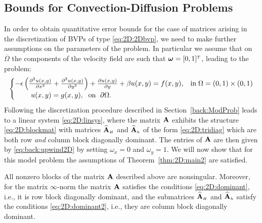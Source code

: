 \subsection{Bounds for Convection-Diffusion Problems}
\label{2D:bounds:conv-diff}
In order to obtain quantitative error bounds for the case of matrices arising
in the discretization of BVPs of type \eqref{eq:2D:2Dbvp}, we need to make
further assumptions on the parameters of the problem. In particular we assume
that on $\overline{\Omega}$ the components of the velocity field are such
that $\bm{\omega}=[0,1]^{\scriptscriptstyle T}$, leading to the problem:
%
\begin{equation}\label{eq:2D:2Dbvp_e}
\begin{cases}
-\epsilon\left(\frac{\partial^2 u(x,y)}{\partial x^2} + \frac{\partial^2 u(x,y)}{\partial y^2}\right) + \frac{\partial u(x,y)}{\partial y}+ \beta u(x,y)=f(x,y), & \text{in}\; \Omega=(0,1)\times(0,1)\\
\hspace{0.8cm} u(x,y)=g(x,y),\;\text{ on }\;\partial\Omega. &
\end{cases}
\end{equation}
%
Following the discretization procedure described in Section~\ref{back:ModProb}
leads to a linear system \eqref{eq:2D:linsys}, where the matrix $\mathbf{A}$ exhibits
the structure \eqref{eq:2D:blockmat} with matrices $\widehat{\mathbf{A}}_{\scriptscriptstyle H}$ and $\widehat{\mathbf{A}}_{\scriptscriptstyle h}$
of the form \eqref{eq:2D:tridiag} which are both row \emph{and} column block
diagonally dominant. The entries of $\mathbf{A}$ are then given by
\eqref{eq:back:upwind2D} by setting $\omega_x=0$ and $\omega_y=1$. We will now
show that for this model problem the assumptions of Theorem~\ref{thm:2D:main2}
are satisfied.

\begin{lemma}\label{lem:2D:BDDcon-dif}
All nonzero blocks of the matrix $\mathbf{A}$ described above are nonsingular.
Moreover, for the matrix $\infty$-norm the matrix $\mathbf{A}$ satisfies the
conditions \eqref{eq:2D:dominant}, i.e., it is row block diagonally dominant,
and the submatrices $\widehat{\mathbf{A}}_{\scriptscriptstyle H}$ and $\widehat{\mathbf{A}}_{\scriptscriptstyle h}$ satisfy the conditions
\eqref{eq:2D:dominant2}, i.e., they are column block diagonally dominant.
\end{lemma}

